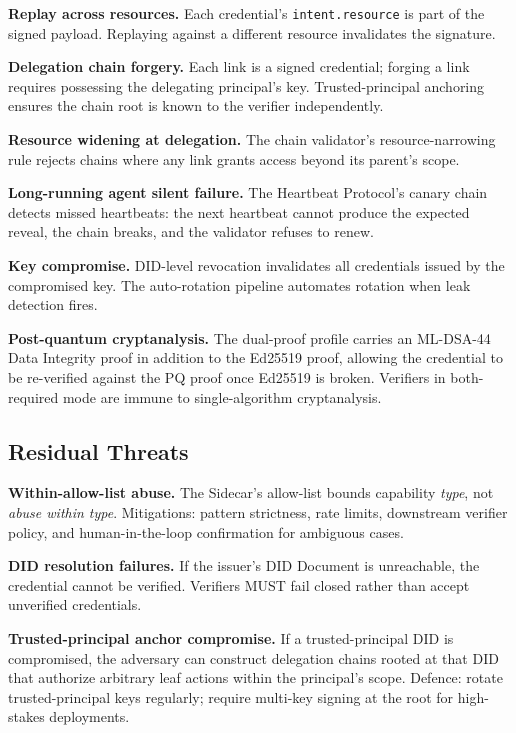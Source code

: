 \documentclass[11pt,a4paper,twocolumn]{article}
\begin{document}
\noindent\textbf{Replay across resources.} Each credential's \verb|intent.resource| is part of the signed payload. Replaying against a different resource invalidates the signature.

\noindent\textbf{Delegation chain forgery.} Each link is a signed credential; forging a link requires possessing the delegating principal's key. Trusted-principal anchoring ensures the chain root is known to the verifier independently.

\noindent\textbf{Resource widening at delegation.} The chain validator's resource-narrowing rule rejects chains where any link grants access beyond its parent's scope.

\noindent\textbf{Long-running agent silent failure.} The Heartbeat Protocol's canary chain detects missed heartbeats: the next heartbeat cannot produce the expected reveal, the chain breaks, and the validator refuses to renew.

\noindent\textbf{Key compromise.} DID-level revocation invalidates all credentials issued by the compromised key. The auto-rotation pipeline automates rotation when leak detection fires.

\noindent\textbf{Post-quantum cryptanalysis.} The dual-proof profile carries an ML-DSA-44 Data Integrity proof in addition to the Ed25519 proof, allowing the credential to be re-verified against the PQ proof once Ed25519 is broken. Verifiers in both-required mode are immune to single-algorithm cryptanalysis.

\subsection{Residual Threats}

\noindent\textbf{Within-allow-list abuse.} The Sidecar's allow-list bounds capability \emph{type}, not \emph{abuse within type}. Mitigations: pattern strictness, rate limits, downstream verifier policy, and human-in-the-loop confirmation for ambiguous cases.

\noindent\textbf{DID resolution failures.} If the issuer's DID Document is unreachable, the credential cannot be verified. Verifiers MUST fail closed rather than accept unverified credentials.

\noindent\textbf{Trusted-principal anchor compromise.} If a trusted-principal DID is compromised, the adversary can construct delegation chains rooted at that DID that authorize arbitrary leaf actions within the principal's scope. Defence: rotate trusted-principal keys regularly; require multi-key signing at the root for high-stakes deployments.
\end{document}
